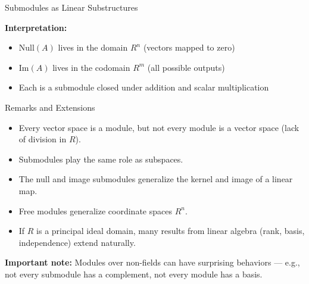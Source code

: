\documentclass[11pt,aspectratio=43,ignorenonframetext,t]{beamer}
\begin{document}
\begin{frame}[fragile]{Submodules as Linear Substructures}

\begin{center}
\centering
{}
\end{center}

\vspace{0.3cm}

\textbf{Interpretation:}  
\begin{itemize}
\item Null$(A)$ lives in the domain $R^n$ (vectors mapped to zero)
\item Im$(A)$ lives in the codomain $R^m$ (all possible outputs)
\item Each is a submodule closed under addition and scalar multiplication
\end{itemize}

\end{frame}


\begin{frame}{Remarks and Extensions}
\begin{itemize}
  \item Every vector space is a module, but not every module is a vector space (lack of division in $R$).
  \item Submodules play the same role as subspaces.
  \item The null and image submodules generalize the kernel and image of a linear map.
  \item Free modules generalize coordinate spaces $R^n$.
  \item If $R$ is a principal ideal domain, many results from linear algebra (rank, basis, independence) extend naturally.
\end{itemize}

\textbf{Important note:}  
Modules over non-fields can have surprising behaviors — e.g., not every submodule has a complement, not every module has a basis.
\end{frame}
\end{document}
